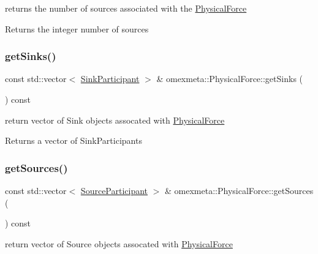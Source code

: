 returns the number of sources associated with the \hyperlink{classomexmeta_1_1PhysicalForce}{Physical\+Force} 

\begin{DoxyReturn}{Returns}
the integer number of sources 
\end{DoxyReturn}
\mbox{\label{classomexmeta_1_1PhysicalForce_ab37bbe3a0f762066fdb43e5c2ce608eb}} 
\subsubsection{\texorpdfstring{get\+Sinks()}{getSinks()}}
{\footnotesize\ttfamily const std\+::vector$<$ \hyperlink{classomexmeta_1_1SinkParticipant}{Sink\+Participant} $>$ \& omexmeta\+::\+Physical\+Force\+::get\+Sinks (\begin{DoxyParamCaption}{ }\end{DoxyParamCaption}) const}



return vector of Sink objects assocated with \hyperlink{classomexmeta_1_1PhysicalForce}{Physical\+Force} 

\begin{DoxyReturn}{Returns}
a vector of Sink\+Participants 
\end{DoxyReturn}
\mbox{\label{classomexmeta_1_1PhysicalForce_aa42b8e04573d2ae88f952c76b146d5ac}} 
\subsubsection{\texorpdfstring{get\+Sources()}{getSources()}}
{\footnotesize\ttfamily const std\+::vector$<$ \hyperlink{classomexmeta_1_1SourceParticipant}{Source\+Participant} $>$ \& omexmeta\+::\+Physical\+Force\+::get\+Sources (\begin{DoxyParamCaption}{ }\end{DoxyParamCaption}) const}



return vector of Source objects assocated with \hyperlink{classomexmeta_1_1PhysicalForce}{Physical\+Force} 

